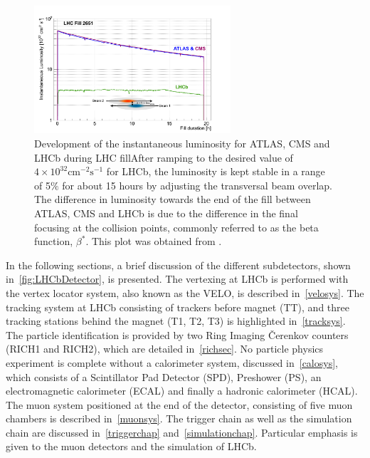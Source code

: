\begin{figure}
	\centering
        \includegraphics[width = 0.65\textwidth]{figs/detector/lumicompare.png}%
	\caption{Development of the instantaneous luminosity for \Gls{ATLAS}, \Gls{CMS} and \Gls{LHCb} during \DIFaddbeginFL {}\DIFaddendFL LHC fill\DIFdelbeginFL {}\DIFdelendFL \DIFaddbeginFL {}\DIFaddendFL After ramping to the desired value of $4\times10^{32}\mathrm{cm^{-2}s^{-1}}$
	for \Gls{LHCb}, the luminosity is kept stable in a range of 5$\%$ for about 15 hours by adjusting the transversal beam overlap. The difference in luminosity towards the end of the fill between \Gls{ATLAS}, \Gls{CMS} and \Gls{LHCb} is due to the difference in the final focusing at the collision points, commonly referred to as the beta function, $\beta^{*}$. This plot was obtained from \cite{LHCb-DP-2014-002}.}
	\label{fig:lhcbintlumi}
\end{figure}

In the following sections, a brief discussion of the different subdetectors, shown in~\autoref{fig:LHCbDetector}, is presented. The vertexing at \gls{LHCb} is performed with the vertex locator system, also known as the VELO, \DIFaddbegin {}\DIFaddend is described in~\autoref{velosys}. The tracking system at \gls{LHCb} consisting of trackers before \DIFaddbegin {}\DIFaddend magnet (TT), and three tracking stations behind the magnet (T1, T2, T3) is highlighted in~\autoref{tracksys}. The particle identification is provided by two Ring Imaging \v{C}erenkov counters (RICH1 and RICH2), which are detailed in~\autoref{richsec}. No particle physics experiment is complete without a calorimeter system, discussed in~\autoref{calosys}, which consists of a Scintillator Pad Detector (SPD), Preshower (PS), an electromagnetic calorimeter (ECAL) and finally a hadronic calorimeter (HCAL). The muon system positioned at the end of the detector, consisting of five muon chambers is described in~\autoref{muonsys}. The trigger chain as well as the simulation chain are discussed in~\autoref{triggerchap} and~\autoref{simulationchap}. Particular emphasis is given to the muon detectors and the simulation of \gls{LHCb}.

